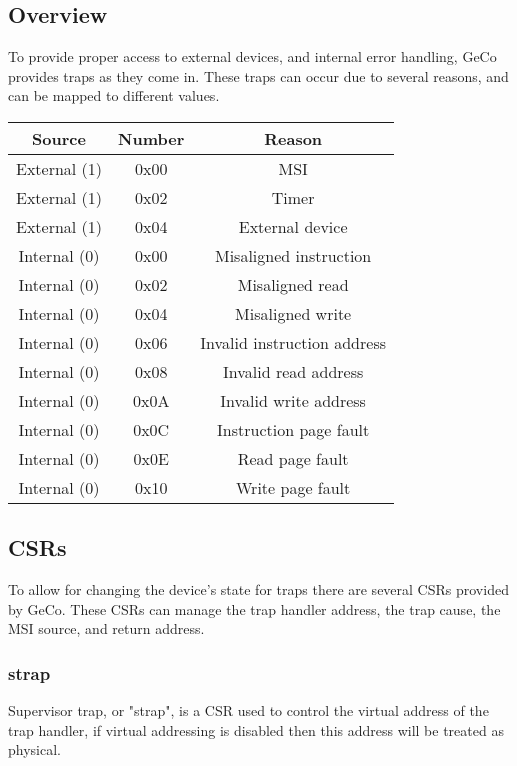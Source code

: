 \documentclass{article}
\begin{document}
\subsection{Overview}
To provide proper access to external devices, and internal error handling, GeCo provides traps as they come in. These traps can occur due to several reasons, and can be mapped to different values.
\begin{center}
\begin{tabular}{ |c|c|c| }
    \hline
    Source & Number & Reason \\
    \hline
    External (1) & 0x00 & MSI \\
    External (1) & 0x02 & Timer \\
    External (1) & 0x04 & External device \\
    \hline
    Internal (0) & 0x00 & Misaligned instruction \\
    Internal (0) & 0x02 & Misaligned read \\
    Internal (0) & 0x04 & Misaligned write \\
    Internal (0) & 0x06 & Invalid instruction address \\
    Internal (0) & 0x08 & Invalid read address \\
    Internal (0) & 0x0A & Invalid write address \\
    Internal (0) & 0x0C & Instruction page fault \\
    Internal (0) & 0x0E & Read page fault \\
    Internal (0) & 0x10 & Write page fault \\
    \hline
\end{tabular}
\end{center}

\subsection{CSRs}
To allow for changing the device's state for traps there are several CSRs provided by GeCo. These CSRs can manage the trap handler address, the trap cause, the MSI source, and return address.

\subsubsection{strap}
Supervisor trap, or "strap", is a CSR used to control the virtual address of the trap handler, if virtual addressing is disabled then this address will be treated as physical.
\end{document}
